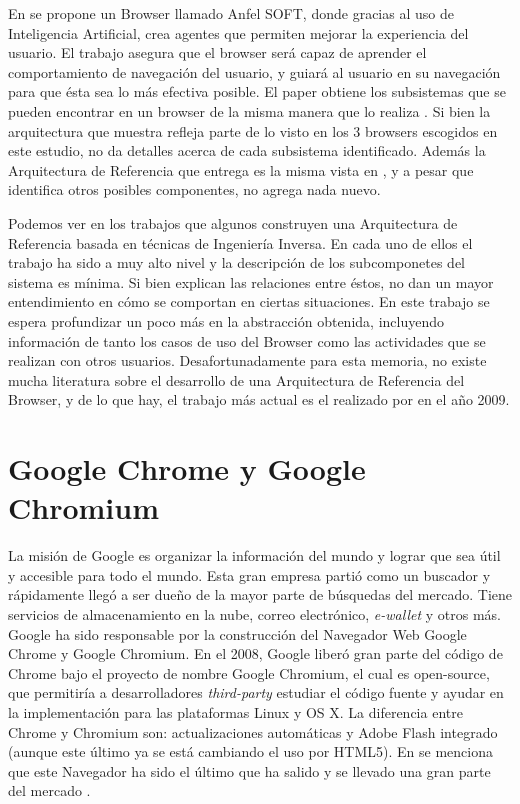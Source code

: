 En \cite{Lwin2009} se propone un Browser llamado Anfel SOFT, donde gracias al uso de Inteligencia Artificial, crea agentes que permiten mejorar la experiencia del usuario. El trabajo asegura que el browser será capaz de aprender el comportamiento de navegación del usuario, y guiará al usuario en su navegación para que ésta sea lo más efectiva posible. El paper obtiene los subsistemas que se pueden encontrar en un browser de la misma manera que lo realiza \cite{2005-grosskurth-browser-refarch}. Si bien la arquitectura que muestra refleja parte de lo visto en los 3 browsers escogidos en este estudio, no da detalles acerca de cada subsistema identificado. Además la Arquitectura de Referencia que entrega es la misma vista en \cite{2005-grosskurth-browser-refarch, preprint-grosskurth-browser-archevol}, y a pesar que identifica otros posibles componentes, no agrega nada nuevo.

Podemos ver en los trabajos que algunos construyen una Arquitectura de Referencia basada en técnicas de Ingeniería Inversa. En cada uno de ellos el trabajo ha sido a muy alto nivel y la descripción de los subcomponetes del sistema es mínima. Si bien explican las relaciones entre éstos, no dan un mayor entendimiento en cómo se comportan en ciertas situaciones. En este trabajo se espera profundizar un poco más en la abstracción obtenida, incluyendo información de tanto los casos de uso del Browser como las actividades que se realizan con otros usuarios. Desafortunadamente para esta memoria, no existe mucha literatura sobre el desarrollo de una Arquitectura de Referencia del Browser, y de lo que hay, el trabajo más actual es el realizado por \cite{Lwin2009} en el año 2009.


\section{Google Chrome y Google Chromium}
    \label{chap3:GC}
    La misión de Google es organizar la información del mundo y lograr que sea útil y accesible para todo el mundo. Esta gran empresa partió como un buscador y rápidamente llegó a ser dueño de la mayor parte de búsquedas del mercado. Tiene servicios de almacenamiento en la nube, correo electrónico, \textit{e-wallet} y otros más. Google ha sido responsable por la construcción del Navegador Web Google Chrome y Google Chromium. En el 2008, Google liberó gran parte del código de Chrome bajo el proyecto de nombre Google Chromium, el cual es open-source, que permitiría a desarrolladores \textit{third-party} estudiar el código fuente y ayudar en la implementación para las plataformas Linux y OS X. La diferencia entre Chrome y Chromium son: actualizaciones automáticas y Adobe Flash integrado (aunque este último ya se está cambiando el uso por HTML5). En  \cite{EvolutionofWeb} se menciona que este Navegador ha sido el último que ha salido y se llevado una gran parte del mercado \cite{statBrow}.


